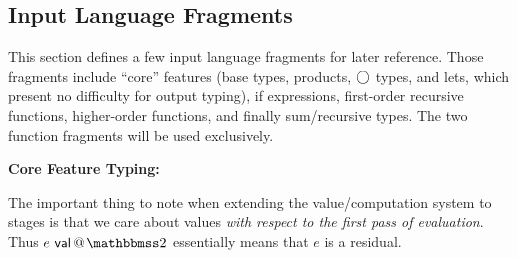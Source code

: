 \documentclass[]{article}
\newcommand {\next}{asdlfkj}
\begin{document}
\begin{abstrsyn}
\section{Input Language Fragments}

This section defines a few input language fragments for later reference.
Those fragments include ``core'' features (base types, products, $\bigcirc$ types, and lets, which present no difficulty for output typing), 
if expressions, first-order recursive functions, higher-order functions, and finally sum/recursive types.
The two function fragments will be used exclusively.

\begin{framed}
\noindent\textbf{Core Feature Typing:}
\end{framed}

The important thing to note when extending the value/computation system to stages is that
we care about values \emph{with respect to the first pass of evaluation}.
Thus $e \valt$ essentially means that $e$ is a residual.


\end{abstrsyn}
\end{document}
